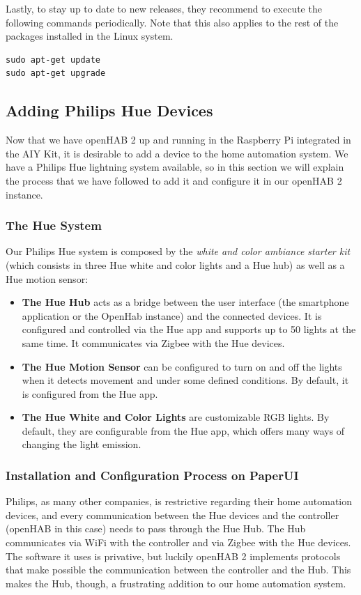Lastly, to stay up to date to new releases, they recommend to execute the following commands periodically. Note that this also applies
to the rest of the packages installed in the Linux system.

\begin{lstlisting}[style=Consola]
sudo apt-get update
sudo apt-get upgrade
\end{lstlisting}

\subsection{Adding Philips Hue Devices}
Now that we have openHAB 2 up and running in the Raspberry Pi integrated in the AIY Kit, it is desirable to add a device to the home
automation system. We have a Philips Hue lightning system available, so in this section we will explain the process that we have
followed to add it and configure it in our openHAB 2 instance.

\subsubsection{The Hue System}
Our Philips Hue system is composed by the \textit{white and color ambiance starter kit}\cite{philipsHueMeethue} (which consists
in three Hue white and color lights and a Hue hub) as well as a Hue motion sensor:

\begin{itemize}
    \item \textbf{The Hue Hub} acts as a bridge between the user interface (the smartphone application or the OpenHab instance) and
    the connected devices. It is configured and controlled via the Hue app and supports up to 50 lights at the same time. It communicates
    via Zigbee with the Hue devices.
    \item \textbf{The Hue Motion Sensor} can be configured to turn on and off the lights when it detects movement and under some
    defined conditions. By default, it is configured from the Hue app.
    \item \textbf{The Hue White and Color Lights} are customizable RGB lights. By default, they are configurable from the Hue app,
    which offers many ways of changing the light emission.
\end{itemize}

\subsubsection{Installation and Configuration Process on PaperUI}
Philips, as many other companies, is restrictive regarding their home automation devices, and every communication between the Hue
devices and the controller (openHAB in this case) needs to pass through the Hue Hub. The Hub communicates via WiFi with the controller
and via Zigbee with the Hue devices. The software it uses is privative, but luckily openHAB 2 implements protocols that make possible
the communication between the controller and the Hub. This makes the Hub, though, a frustrating addition to our home automation system.

